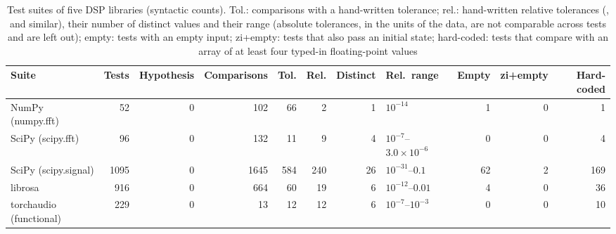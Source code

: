 \begin{table}[t]
\caption{Test suites of five DSP libraries (syntactic counts). Tol.: comparisons with a hand-written tolerance; rel.: hand-written relative tolerances (,  and similar), their number of distinct values and their range (absolute tolerances, in the units of the data, are not comparable across tests and are left out); empty: tests with an empty input; zi+empty: tests that also pass an initial state; hard-coded: tests that compare with an array of at least four typed-in floating-point values}
\label{tab:survey}
\centering\footnotesize
\begin{tabular}{@{}lrrrrrrlrrr@{}}
\toprule
Suite & Tests & Hypothesis & Comparisons & Tol. & Rel. & Distinct & Rel.\ range & Empty & zi+empty & Hard-coded \\
\midrule
NumPy (numpy.fft) & 52 & 0 & 102 & 66 & 2 & 1 & $10^{-14}$ & 1 & 0 & 1 \\
SciPy (scipy.fft) & 96 & 0 & 132 & 11 & 9 & 4 & $10^{-7}$--$3.0\times10^{-6}$ & 0 & 0 & 4 \\
SciPy (scipy.signal) & 1095 & 0 & 1645 & 584 & 240 & 26 & $10^{-31}$--$0.1$ & 62 & 2 & 169 \\
librosa & 916 & 0 & 664 & 60 & 19 & 6 & $10^{-12}$--$0.01$ & 4 & 0 & 36 \\
torchaudio (functional) & 229 & 0 & 13 & 12 & 12 & 6 & $10^{-7}$--$10^{-3}$ & 0 & 0 & 10 \\
\bottomrule
\end{tabular}
\end{table}
